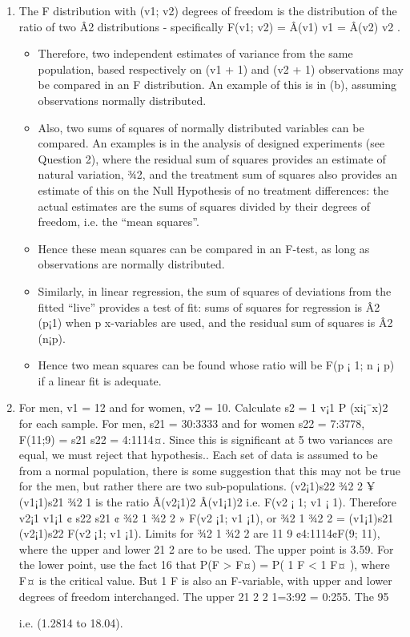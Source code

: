 \documentclass[a4paper,12pt]{article}
\begin{document}
\begin{enumerate}
\item The F distribution with (v1; v2) degrees of freedom is the distribution of the
ratio of two Â2 distributions - specifically F(v1; v2) = Â(v1)
v1
=
Â(v2)
v2
. 
\begin{itemize}
\item Therefore,
two independent estimates of variance from the same population, based respectively
on (v1 + 1) and (v2 + 1) observations may be compared in an F
distribution. An example of this is in (b), assuming observations normally
distributed.
\item Also, two sums of squares of normally distributed variables can be compared.
An examples is in the analysis of designed experiments (see Question
2), where the residual sum of squares provides an estimate of natural variation,
¾2, and the treatment sum of squares also provides an estimate of
this on the Null Hypothesis of no treatment differences: the actual estimates
are the sums of squares divided by their degrees of freedom, i.e. the “mean
squares”.
\item Hence these mean squares can be compared in an F-test, as long
as observations are normally distributed.
\item Similarly, in linear regression, the sum of squares of deviations from the fitted
“live” provides a test of fit: sums of squares for regression is Â2
(p¡1) when
p x-variables are used, and the residual sum of squares is Â2
(n¡p). 
\item Hence two
mean squares can be found whose ratio will be F(p ¡ 1; n ¡ p) if a linear fit
is adequate.
\end{itemize}
\item  For men, v1 = 12 and for women, v2 = 10. Calculate s2 = 1
v¡1
P
(xi¡¯x)2 for
each sample. For men, s21
= 30:3333 and for women s22
= 7:3778, F(11;9) =
s21
s22
= 4:1114¤. Since this is significant at 5%
two variances are equal, we must reject that hypothesis.. Each set of data is
assumed to be from a normal population, there is some suggestion that this
may not be true for the men, but rather there are two sub-populations.
(v2¡1)s22 ¾2
2
¥ (v1¡1)s21
¾2
1
is the ratio Â(v2¡1)2
Â(v1¡1)2
i.e. F(v2 ¡ 1; v1 ¡ 1). Therefore
v2¡1
v1¡1 ¢ s22
s21
¢ ¾2
1
¾2
2
» F(v2 ¡1; v1 ¡1), or ¾2
1
¾2
2
= (v1¡1)s21
(v2¡1)s22
F(v2 ¡1; v1 ¡1). Limits for
¾2
1
¾2
2
are 11
9 ¢4:1114¢F(9; 11), where the upper and lower 21
2%
are to be used. The upper point is 3.59. For the lower point, use the fact
16
that P(F > F¤) = P( 1
F < 1
F¤ ), where F¤ is the critical value. But 1
F is also
an F-variable, with upper and lower degrees of freedom interchanged. The
upper 21
2%
2%
1=3:92 = 0:255. The 95%

i.e. (1.2814 to 18.04).
\end{enumerate}
\end{document}
